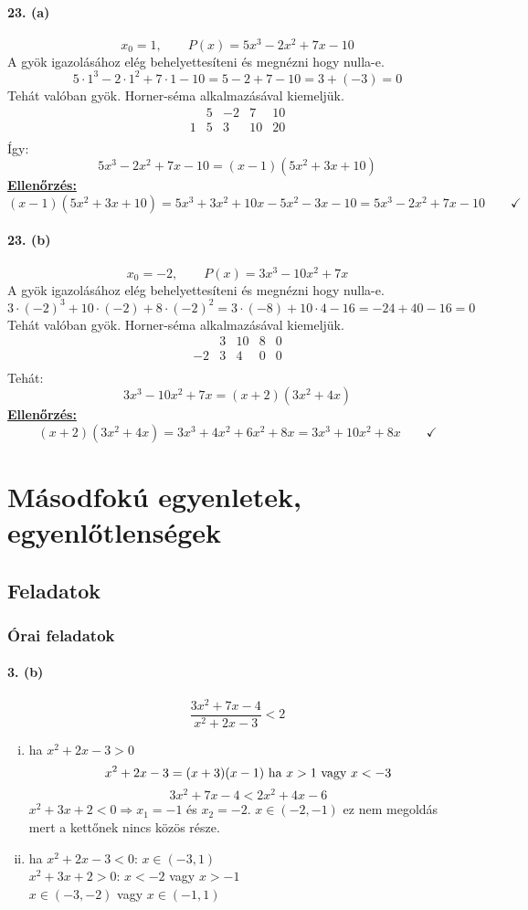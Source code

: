 \documentclass[12pt,a4paper,fleqn]{article}
\newcommand{\myparagraph}[1]{\paragraph{#1}\mbox{}}
\begin{document}
\myparagraph{23. (a)}
\[ x_0 = 1, \qquad P(x) = 5x^3 - 2x^2 + 7x -10 \]
A gyök igazolásához elég behelyettesíteni és megnézni hogy nulla-e.
\[ 5 \cdot 1^3 - 2 \cdot 1^2 + 7 \cdot 1 -10  = 5 - 2 + 7 - 10 = 3 + (-3) = 0 \]
Tehát valóban gyök. Horner-séma alkalmazásával kiemeljük.
\[
  \begin{array}{c|cccc}
    & 5 & -2 &  7 & 10 \\ \hline
  1 &  5 & 3 &  10 & 20 \\
 \end{array}
\]
Így:
\[
  5x^3 - 2x^2 + 7x -10=(x-1)(5x^2+3x+10)
\]
\underline{\textbf{Ellenőrzés:}}
\[
  (x-1)(5x^2+3x+10) = 5x^3 + 3x^2 + 10x - 5x^2 - 3x -10 = 5x^3-2x^2+7x-10
  \qquad \checkmark
\]


\myparagraph{23. (b)}
\[ x_0 = -2, \qquad P(x) = 3x^3 - 10x^2 + 7x \]
A gyök igazolásához elég behelyettesíteni és megnézni hogy nulla-e.
\[ 3 \cdot (-2)^3 + 10 \cdot (-2) + 8 \cdot (-2)^2 = 3 \cdot (-8) + 10 \cdot 4 - 16 = -24 + 40 - 16 = 0 \]
Tehát valóban gyök. Horner-séma alkalmazásával kiemeljük.
\[
  \begin{array}{c|cccc}
    & 3 & 10 & 8 & 0 \\ \hline
 -2 & 3 & 4  & 0 & 0 \\
 \end{array}
\]
Tehát:
\[
  3x^3 - 10x^2 + 7x=(x+2)(3x^2+4x)
\]
\underline{\textbf{Ellenőrzés:}}
\[
  (x+2)(3x^2+4x)=3x^3+4x^2+6x^2+8x=3x^3+10x^2+8x
  \qquad \checkmark
\]

\section{Másodfokú egyenletek, egyenlőtlenségek}
\setcounter{subsection}{1}
\subsection{Feladatok}
\subsubsection{Órai feladatok}


\myparagraph{3. (b)}
\[ \dfrac{3x^2+7x-4}{x^2+2x-3} < 2 \]
\begin{enumerate}[i.]
  \item ha $x^2+2x-3 > 0$
  \[ x^2+2x-3 = (x+3)(x-1)$ ha $x>1$ vagy $x<-3 \]
  \[ 3x^2+7x-4 < 2x^2+4x-6 \]
  $x^2 + 3x + 2 < 0 \Rightarrow x_1=-1$ és $x_2=-2$. $x \in (-2, -1)$ ez nem megoldás
  mert a kettőnek nincs közös része.
  \item ha $x^2+2x-3 < 0$: $x \in (-3, 1)$ \\
  $x^2+3x+2 > 0$: $x<-2$ vagy $x>-1$ \\
  $x \in (-3, -2)$ vagy $x \in (-1, 1)$
\end{enumerate}
\end{document}
